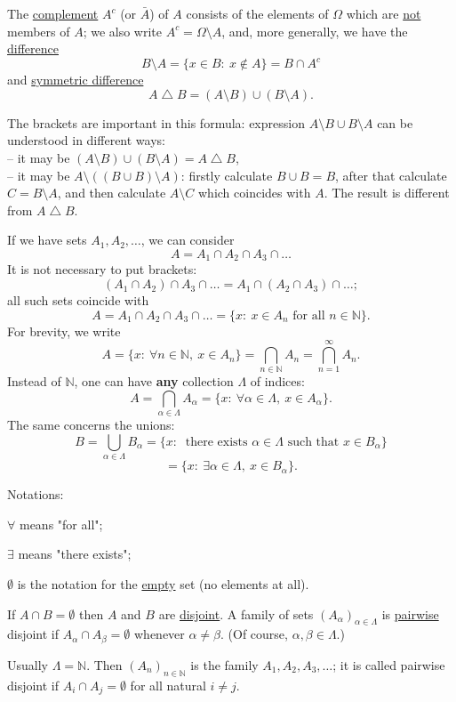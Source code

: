 \documentclass[a4paper,10pt]{article}
\def\NN{\mathbb{N}}
\newcommand{\1}[1]{\mathbf{1}_{\{#1\}}}
\begin{document}
The \underline{complement} $A^c$ (or $\bar A$) of $A$ consists of the elements of $\Omega$ which are \underline{not} members of $A$; we also write $A^c=\Omega\setminus A$, and, more generally, we have the \underline{difference}
  $$B\setminus A=\{x\in B:~ x\notin A\}=B\cap A^c$$
and \underline{symmetric difference}
  $$A\bigtriangleup B=(A\setminus B)\cup(B\setminus A).$$

The brackets are important in this formula: expression $A\setminus B\cup B\setminus A$ can be understood in different ways:\\
-- it may be $(A\setminus B)\cup(B\setminus A)=A\bigtriangleup B$,\\
-- it may be $A\setminus ((B\cup B)\setminus A)$: firstly calculate $B\cup B=B$, after that calculate $C=B\setminus A$, and then calculate $A\setminus C$ which coincides with $A$. The result is different from $A\bigtriangleup B$.

If we have sets $A_1,A_2,\ldots$, we can consider
  $$A=A_1\cap A_2\cap A_3\cap \ldots$$
It is not necessary to put brackets:
  $$(A_1\cap A_2)\cap A_3\cap \ldots=A_1\cap (A_2\cap A_3)\cap \ldots;$$
all such sets coincide with
  $$A=A_1\cap A_2\cap A_3\cap \ldots=\{x:~x\in A_n \mbox{ for all } n\in\NN\}.$$
For brevity, we write
  $$A=\{x:~\forall n\in\NN,~ x\in A_n\}=\bigcap_{n\in\NN} A_n=\bigcap_{n=1}^\infty A_n.$$
Instead of $\NN$, one can have {\bf any} collection $\Lambda$ of indices:
  $$A=\bigcap_{\alpha\in\Lambda} A_\alpha=\{x:~\forall \alpha\in\Lambda,~x\in A_\alpha\}.$$
The same concerns the unions:
  $$B=\bigcup_{\alpha\in\Lambda} B_\alpha=\{x:~\mbox{ there exists $\alpha\in\Lambda$ such that } x\in B_\alpha\}$$
  $$=\{x:~\exists \alpha\in\Lambda,~x\in B_\alpha\}.$$\vspace{3mm}

Notations:

$\forall$ means "for all";

$\exists$ means "there exists";

$\emptyset$ is the notation for the \underline{empty} set (no elements at all). \vspace{5mm}

If $A\cap B=\emptyset$ then $A$ and $B$ are \underline{disjoint}. A family of sets $(A_\alpha)_{\alpha\in\Lambda}$ is \underline{pairwise} disjoint if $A_\alpha\cap A_\beta=\emptyset$ whenever $\alpha\ne\beta$. (Of course, $\alpha,\beta\in\Lambda$.)

Usually $\Lambda=\NN$. Then $(A_n)_{n\in\NN}$ is the family $A_1,A_2,A_3,\ldots$; it is called pairwise disjoint if $A_i\cap A_j=\emptyset$ for all natural $i\ne j$.\vspace{3mm}
\end{document}
